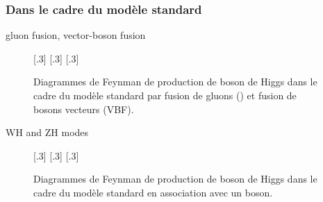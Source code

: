 \subsubsection{Dans le cadre du modèle standard}
gluon fusion, vector-boson fusion
\begin{figure}[h]
\centering
\vspace{\baselineskip}
[.3\textwidth]
{\vspace{\baselineskip}}
\hfill
{}[.3\textwidth]
{\vspace{\baselineskip}}
\hfill
{}[.3\textwidth]
{\vspace{\baselineskip}}
\caption[Production de boson de Higgs par fusion de gluons et de bosons vecteurs.]{Diagrammes de Feynman de production de boson de Higgs dans le cadre du modèle standard par fusion de gluons (\gluon\gluon\higgs) et fusion de bosons vecteurs (VBF).}
\label{fig-fgraph-Higgs_prod_ggh_VBF}
\end{figure}

WH and ZH modes
\begin{figure}[h]
\centering
\vspace{\baselineskip}
[.3\textwidth]
{\vspace{\baselineskip}}
\hfill
{}[.3\textwidth]
{\vspace{\baselineskip}}
\hfill
{}[.3\textwidth]
{\vspace{\baselineskip}}
\caption[Production de boson de Higgs en association avec un boson.]{Diagrammes de Feynman de production de boson de Higgs dans le cadre du modèle standard en association avec un boson.}
\label{fig-fgraph-Higgs_prod_VH_ggZh}
\end{figure}

